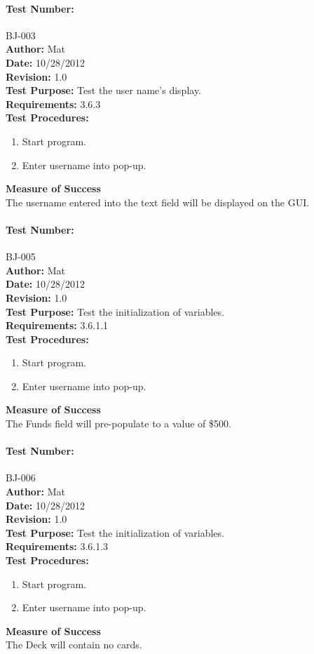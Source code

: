 \documentclass{article}
\begin{document}
\paragraph{Test Number:} BJ-003\\
\textbf{Author:} Mat\\
\textbf{Date:} 10/28/2012\\
\textbf{Revision:} 1.0\\
\textbf{Test Purpose:} Test the user name's display.\\
\textbf{Requirements:} 3.6.3 \\
\textbf{Test Procedures:} 
\begin{enumerate}
\item Start program.
\item Enter username into pop-up.
\end{enumerate}
\textbf{Measure of Success}\\The username entered into the text field will be displayed on the GUI.
\paragraph{Test Number:} BJ-005\\
\textbf{Author:} Mat\\
\textbf{Date:} 10/28/2012\\
\textbf{Revision:} 1.0\\
\textbf{Test Purpose:} Test the initialization of variables.\\
\textbf{Requirements:} 3.6.1.1 \\
\textbf{Test Procedures:} 
\begin{enumerate}
\item Start program.
\item Enter username into pop-up.
\end{enumerate}
\textbf{Measure of Success}\\The Funds field will pre-populate to a value of \$500.
\paragraph{Test Number:} BJ-006\\
\textbf{Author:} Mat\\
\textbf{Date:} 10/28/2012\\
\textbf{Revision:} 1.0\\
\textbf{Test Purpose:} Test the initialization of variables.\\
\textbf{Requirements:} 3.6.1.3 \\
\textbf{Test Procedures:} 
\begin{enumerate}
\item Start program.
\item Enter username into pop-up.
\end{enumerate}
\textbf{Measure of Success}\\The Deck will contain no cards.
\end{document}
